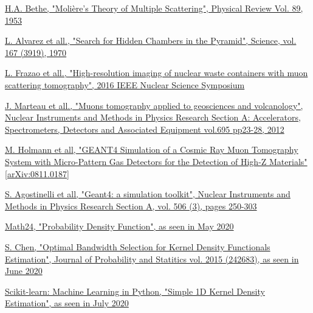 \documentclass[a4paper, 11pt]{report}
\begin{document}
\begin{thebibliography}{1}
\href{https://journals.aps.org/pr/abstract/10.1103/PhysRev.89.1256}{H.A. Bethe,
"Moli\`ere's Theory of Multiple Scattering", 
Physical Review Vol. 89, 1953}

\href{https://ui.adsabs.harvard.edu/abs/1970Sci...167..832A/abstract}{L. Alvarez et all.,
"Search for Hidden Chambers in the Pyramid", 
Science, vol. 167 (3919), 1970}

\href{https://ieeexplore.ieee.org/document/8069918}{L. Frazao et all.,
"High-resolution imaging of nuclear waste containers with muon scattering tomography", 
2016 IEEE Nuclear Science Symposium}

\href{https://ui.adsabs.harvard.edu/abs/1970Sci...167..832A/abstract}{J. Marteau et all.,
"Muons tomography applied to geosciences and volcanology", 
Nuclear Instruments and Methods in Physics Research Section A: Accelerators, Spectrometers, Detectors and Associated Equipment vol.695 pp23-28, 2012
}

\href{https://arxiv.org/pdf/0811.0187.pdf}{M. Holmann et all, "GEANT4 Simulation of a Cosmic Ray Muon Tomography System with Micro-Pattern Gas Detectors for the Detection of High-Z Materials" [arXiv:0811.0187]}

\href{https://www.sciencedirect.com/science/article/pii/S0168900203013688}{S. Agostinelli et all, "Geant4: a simulation toolkit", Nuclear Instruments and Methods in Physics Research Section A, vol. 506 (3), pages 250-303}

\href{https://www.math24.net/probability-density-function/}{Math24, "Probability Density Function", as seen in May 2020}

\href{https://www.hindawi.com/journals/jps/2015/242683/}{S. Chen, "Optimal Bandwidth Selection for Kernel Density Functionals Estimation", Journal of Probability and Statitics vol. 2015 (242683), as seen in June 2020}

\href{https://scikit-learn.org/stable/auto_examples/neighbors/plot_kde_1d.html}{Scikit-learn: Machine Learning in {P}ython, "Simple 1D Kernel Density Estimation", as seen in July 2020}

\end{thebibliography}
\end{document}
